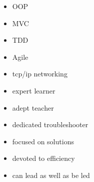 \documentclass[letterpaper]{article}        %
\begin{document}
\begin{multicols}{3}
      \begin{itemize}
            \end{itemize}
    
      \begin{itemize}
            \end{itemize}
    
      \begin{itemize}
        \item OOP
        \item MVC
        \item TDD
        \item Agile
        \end{itemize}
    
      \begin{itemize}
            \end{itemize}
    
      \begin{itemize}
        \item tcp/ip networking
        \end{itemize}
    
      \begin{itemize}
        \item expert learner
        \item adept teacher
        \item dedicated troubleshooter
        \item focused on solutions
        \item devoted to efficiency
        \item can lead as well as be led
        \end{itemize}
    
    
  \end{multicols}
\end{document}
